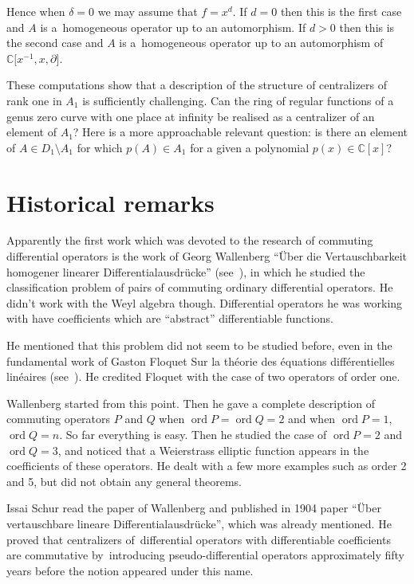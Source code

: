 \documentclass[10pt,a4paper]{amsart}
\numberwithin{equation}{section}
\newcommand{\de}{\partial}
\newcommand{\C}{\mathbb C}
\newcommand{\ord}{\operatorname{ord}}
\begin{document}
Hence when $\delta = 0$ we may assume that $f = x^d$. If $d = 0$ then this is the first case and $A$ is a~homogeneous operator up to an automorphism. If $d > 0$ then this is the second case and $A$ is a~homogeneous operator up to an automorphism of $\C\big[x^{-1},x, \de\big]$.

These computations show that a description of the structure of centralizers of rank one in $A_1$ is sufficiently challenging.
Can the ring of regular functions of a genus zero curve with one place at infinity be realised as a centralizer of an element of $A_1$? Here is a more approachable relevant question: is there an element of $A \in D_1 \setminus A_1$ for which $p(A) \in A_1$ for a given a polynomial $p(x) \in \C[x]$?

\section{Historical remarks}

Apparently the first work which was devoted to the research of commuting differential operators is the work of
Georg Wallenberg ``\"Uber die Vertauschbarkeit homogener linearer Differentialausdr\"ucke'' (see~\cite{W}),
in which he studied the classification problem of pairs of commuting ordinary differential operators. He didn't work with the Weyl algebra though.
Differential ope\-rators he was working with have coefficients which are ``abstract'' differentiable functions.

He mentioned that this problem did not seem to be studied before, even in the fundamental work of Gaston Floquet Sur la th\'eorie des \'equations diff\'erentielles lin\'eaires (see~\cite{F}).
He credited Floquet with the case of two operators of order one.

Wallenberg started from this point. Then he gave a complete description of commuting operators $P$ and $Q$ when $\ord P = \ord Q = 2$ and when $\ord P = 1$, $\ord Q = n$. So far everything is easy. Then he studied the case of $\ord P = 2$ and $\ord Q = 3$, and noticed that a Weierstrass elliptic function appears in the coefficients of these operators.
He dealt with a few more examples such as order 2 and 5, but did not obtain any general theorems.

Issai Schur read the paper of Wallenberg and published in 1904 paper ``\"Uber vertauschbare line\-are Differentialausdr\"ucke'', which was already mentioned. He proved that centralizers of~differential operators with differentiable coefficients are commutative by~introducing pseudo-dif\-fe\-ren\-tial operators approximately fifty years before the notion appeared under this name.
\end{document}
